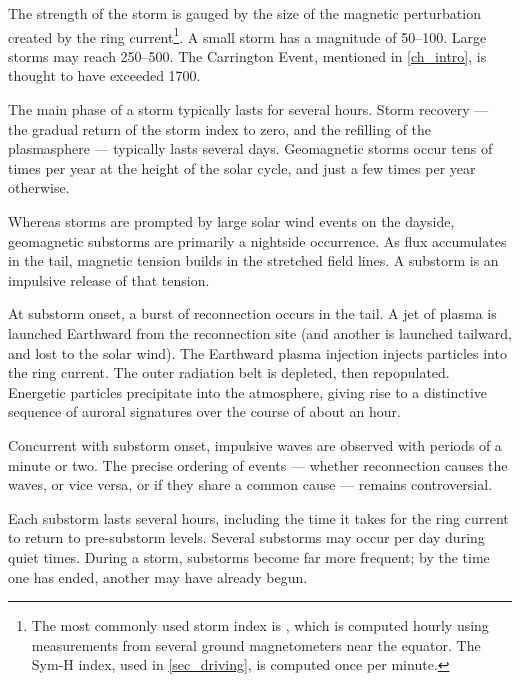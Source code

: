 The strength of the storm is gauged by the size of the magnetic perturbation created by the ring current\footnote{The most commonly used storm index is \DST, which is computed hourly using measurements from several ground magnetometers near the equator. The Sym-H index, used in \cref{sec_driving}, is computed once per minute. }. A small storm has a magnitude of \SIrange{50}{100}{\nT}. Large storms may reach \SIrange{250}{500}{\nT}. The Carrington Event, mentioned in \cref{ch_intro}, is thought to have exceeded \SI{1700}{\nT}\cite{tsurutani_2003}. 

The main phase of a storm typically lasts for several hours. Storm recovery --- the gradual return of the storm index to zero, and the refilling of the plasmasphere --- typically lasts several days. Geomagnetic storms occur tens of times per year at the height of the solar cycle, and just a few times per year otherwise. 

Whereas storms are prompted by large solar wind events on the dayside, geomagnetic substorms are primarily a nightside occurrence. As flux accumulates in the tail, magnetic tension builds in the stretched field lines. A substorm is an impulsive release of that tension. 


At substorm onset, a burst of reconnection occurs in the tail. A jet of plasma is launched Earthward from the reconnection site (and another is launched tailward, and lost to the solar wind). The Earthward plasma injection injects particles into the ring current. The outer radiation belt is depleted, then repopulated. Energetic particles precipitate into the atmosphere, giving rise to a distinctive sequence of auroral signatures over the course of about an hour. 

Concurrent with substorm onset, impulsive \Alfven waves are observed with periods of a minute or two. The precise ordering of events --- whether reconnection causes the waves, or vice versa, or if they share a common cause --- remains controversial. 

Each substorm lasts several hours, including the time it takes for the ring current to return to pre-substorm levels. Several substorms may occur per day during quiet times. During a storm, substorms become far more frequent; by the time one has ended, another may have already begun. 


